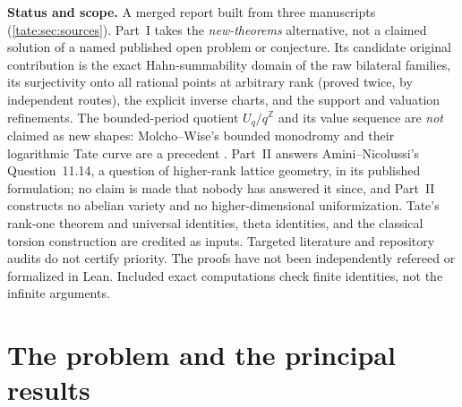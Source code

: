 \documentclass[11pt,letterpaper]{article}
\theoremstyle{definition}
\newcommand{\Z}{\mathbb Z}
\begin{document}
\begin{titlepage}
\begin{abstract}
A second part treats several periods with monomial exponents. Every
admissible lattice in a finite-dimensional higher-rank inner-product space
has a finite positively generating set, which answers affirmatively, and
constructively, Question~11.14 of Amini and Nicolussi as printed in their
2025 article. We characterize exactly when a quadratic lattice family is
strongly Hahn-summable, determine the exact domain of multiscale theta
series and their support order type $\omega^s$, certify theta minima by
finitely many inequalities, and lift smooth initial zeros.

\smallskip\noindent\textbf{Keywords.} Surcomplex numbers; Hahn series;
Tate curve; convex valuation subgroup; strong summability; formal groups;
ramification; higher-rank lattices; theta series.
\end{abstract}
\vfill
\end{titlepage}
\hypersetup{pageanchor=true}

\begin{statusbox}
\textbf{Status and scope.}
A merged report built from three manuscripts (\cref{tate:sec:sources}).
Part~I takes the \emph{new-theorems} alternative, not a claimed solution
of a named published open problem or conjecture. Its candidate original
contribution is the exact Hahn-summability domain of the raw bilateral
families, its surjectivity onto all rational points at arbitrary rank
(proved twice, by independent routes), the explicit inverse charts, and the
support and valuation refinements. The
bounded-period quotient $U_q/q^\Z$ and its value sequence are \emph{not}
claimed as new shapes: Molcho--Wise's bounded monodromy and their
logarithmic Tate curve are a precedent \cite{MW}. Part~II answers
Amini--Nicolussi's Question~11.14, a question of higher-rank lattice
geometry, in its published formulation; no claim is made that nobody has
answered it since, and Part~II constructs no abelian variety and no
higher-dimensional uniformization. Tate's rank-one theorem and universal
identities, theta identities, and the classical torsion construction are
credited as inputs.
Targeted literature and repository audits do not certify priority. The
proofs have not been independently refereed or formalized in Lean.
Included exact computations check finite identities, not the infinite
arguments.
\end{statusbox}

\tableofcontents
\newpage

\section{The problem and the principal results}\label{tate:sec:intro}
\end{document}
